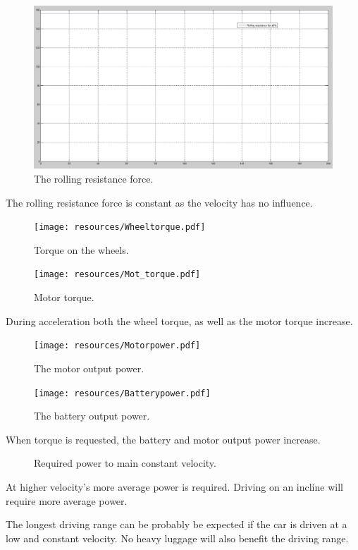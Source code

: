 \documentclass[final]{scrreprt} %
\begin{document}
\begin{figure}[H]
\centering
\includegraphics[scale = 0.27]{resources/Rolling.png}
\caption{The rolling resistance force.}
\label{fig:Rolling}
\end{figure}
The rolling resistance force is constant as the velocity has no influence.
\begin{figure}[H]
\centering
\texttt{[image: resources/Wheeltorque.pdf]}
\caption{Torque on the wheels.}
\label{fig:Wheeltorque}
\end{figure}
\begin{figure}[H]
\centering
\texttt{[image: resources/Mot\_torque.pdf]}
\caption{Motor torque.}
\label{fig:Motortorque}
\end{figure}
During acceleration both the wheel torque, as well as the motor torque increase.
\begin{figure}[H]
\centering
\texttt{[image: resources/Motorpower.pdf]}
\caption{The motor output power.}
\label{fig:Motorpower}
\end{figure}
\begin{figure}[H]
\centering
\texttt{[image: resources/Batterypower.pdf]}
\caption{The battery output power.}
\label{fig:Batterypower}
\end{figure}
When torque is requested, the battery and motor output power increase.

\begin{figure}[H]
	\centering
	\newlength\figureheight 
	\newlength\figurewidth 
	\setlength\figureheight{4cm} 
	\setlength{}
	
	\caption{Required power to main constant velocity.}
	\label{fig:req_power}
\end{figure}
At higher velocity's more average power is required. Driving on an incline will require more average power.

The longest driving range can be probably be expected if the car is driven at a low and constant velocity. No heavy luggage will also benefit the driving range.
\end{document}
